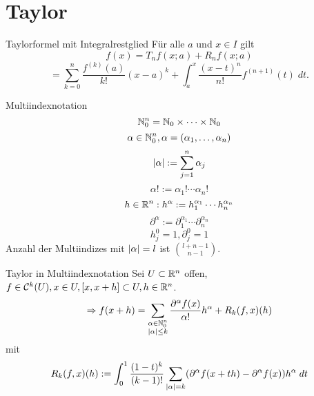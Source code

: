 \documentclass[main.tex]{subfiles}
\begin{document}
\section*{Taylor}

\begin{karte}{Taylorformel mit Integralrestglied}
    Für alle \( a \) und \( x\in I \)
    gilt 
    \[ f(x) = T_n f(x;a) + R_n f(x;a) \]
    \[ = \sum_{k=0}^n \frac{f^{(k)}(a)}{k!} (x-a)^k 
    + \int_a^x \frac{(x-t)^n}{n!} f^{(n+1)}(t) \; dt. \]
\end{karte}

\begin{karte}{Multiindexnotation}
    \[ \N_0^n = \N_0 \times \cdots \times \N_0 \]
    \[ \alpha \in \N_0^n, 
    \alpha = (\alpha_1, \ldots, \alpha_n) \]
    \[ \abs{\alpha} := \sum_{j=1}^n \alpha_j \]
    \[ \alpha! := \alpha_1! \cdots \alpha_n! \]
    \[ h\in \R^n: h^\alpha 
    := h_1^{\alpha_1}\cdots h_n^{\alpha_n} \]
    \[ \partial^\alpha := \partial_1^{\alpha_1} \cdots \partial_n^{\alpha_n} \]
    \[ h_j^0 = 1, \partial_j^0 = 1 \]
    Anzahl der Multiindizes mit \( \abs{\alpha} = l \) ist \( \binom{l+n-1}{n-1} \).
\end{karte}

\begin{karte}{Taylor in Multiindexnotation}
    Sei \( U \subset \R^n \) offen, \( f \in \mathcal{C}^k(U), 
    x \in U, [x,x+h] \subset U, h \in \R^n \).
    \[ \Rightarrow f(x + h) = \sum_{\substack{\alpha \in \N_0^n \\ \abs{\alpha} \leq k}} 
    \frac{ \partial^\alpha f(x) }{\alpha!} h^\alpha 
    + R_k(f, x)(h) \]
    mit 
    \[ R_k(f,x)(h) := \integralx{\frac{(1-t)^k}{(k-1)!} 
    \sum_{\abs{\alpha} = k} 
    (\partial^\alpha f(x+th)-\partial^\alpha f(x))h^\alpha}{0}{1}{t} \]
\end{karte}
\end{document}
